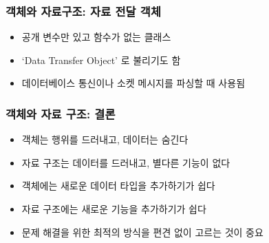 \documentclass{beamer}
\begin{document}
\begin{frame}
    \frametitle{객체와 자료구조: 자료 전달 객체}
    \begin{itemize}
        \item 공개 변수만 있고 함수가 없는 클래스
        \item `Data Transfer Object' 로 불리기도 함
        \item 데이터베이스 통신이나 소켓 메시지를 파싱할 때 사용됨
    \end{itemize}
\end{frame}

\begin{frame}
    \frametitle{객체와 자료 구조: 결론}
    \begin{itemize}
        \item 객체는 행위를 드러내고, 데이터는 숨긴다
        \item 자료 구조는 데이터를 드러내고, 별다른 기능이 없다
        \item 객체에는 새로운 데이터 타입을 추가하기가 쉽다
        \item 자료 구조에는 새로운 기능을 추가하기가 쉽다
        \item 문제 해결을 위한 최적의 방식을 편견 없이 고르는 것이 중요
    \end{itemize}
\end{frame}
\end{document}
